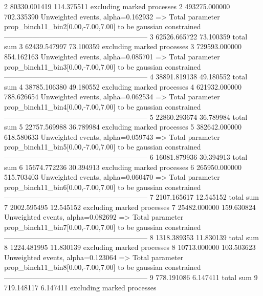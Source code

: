 2          80330.001419    114.375511      excluding marked processes    
2          493275.000000   702.335390      Unweighted events, alpha=0.162932
  => Total parameter prop_binch11_bin2[0.00,-7.00,7.00] to be gaussian constrained
------------------------------------------------------------
3          62526.665722    73.100359       total sum                     
3          62439.547997    73.100359       excluding marked processes    
3          729593.000000   854.162163      Unweighted events, alpha=0.085701
  => Total parameter prop_binch11_bin3[0.00,-7.00,7.00] to be gaussian constrained
------------------------------------------------------------
4          38891.819138    49.180552       total sum                     
4          38785.106380    49.180552       excluding marked processes    
4          621932.000000   788.626654      Unweighted events, alpha=0.062534
  => Total parameter prop_binch11_bin4[0.00,-7.00,7.00] to be gaussian constrained
------------------------------------------------------------
5          22860.293674    36.789984       total sum                     
5          22757.569988    36.789984       excluding marked processes    
5          382642.000000   618.580633      Unweighted events, alpha=0.059743
  => Total parameter prop_binch11_bin5[0.00,-7.00,7.00] to be gaussian constrained
------------------------------------------------------------
6          16081.879936    30.394913       total sum                     
6          15674.772236    30.394913       excluding marked processes    
6          265950.000000   515.703403      Unweighted events, alpha=0.060470
  => Total parameter prop_binch11_bin6[0.00,-7.00,7.00] to be gaussian constrained
------------------------------------------------------------
7          2107.165617     12.545152       total sum                     
7          2002.595495     12.545152       excluding marked processes    
7          25482.000000    159.630824      Unweighted events, alpha=0.082692
  => Total parameter prop_binch11_bin7[0.00,-7.00,7.00] to be gaussian constrained
------------------------------------------------------------
8          1318.389353     11.830139       total sum                     
8          1224.481995     11.830139       excluding marked processes    
8          10713.000000    103.503623      Unweighted events, alpha=0.123064
  => Total parameter prop_binch11_bin8[0.00,-7.00,7.00] to be gaussian constrained
------------------------------------------------------------
9          778.191086      6.147411        total sum                     
9          719.148117      6.147411        excluding marked processes    
